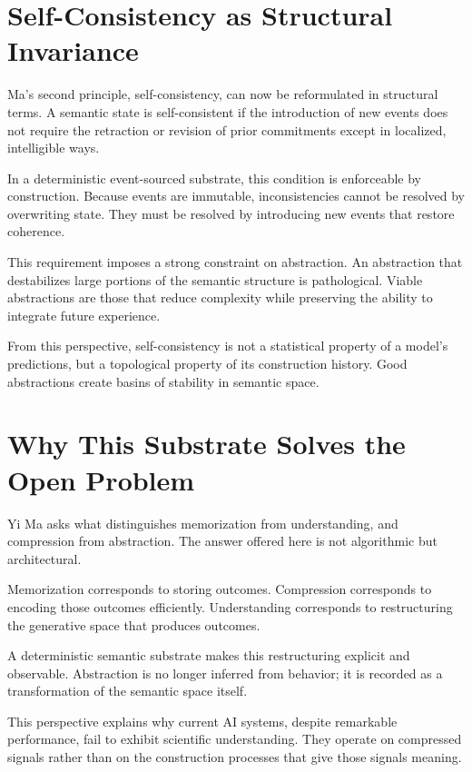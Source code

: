 \documentclass[11pt]{article}
\begin{document}
\section{Self-Consistency as Structural Invariance}

Ma’s second principle, self-consistency, can now be reformulated in
structural terms. A semantic state is self-consistent if the introduction
of new events does not require the retraction or revision of prior
commitments except in localized, intelligible ways.

In a deterministic event-sourced substrate, this condition is enforceable
by construction. Because events are immutable, inconsistencies cannot be
resolved by overwriting state. They must be resolved by introducing new
events that restore coherence.

This requirement imposes a strong constraint on abstraction. An
abstraction that destabilizes large portions of the semantic structure is
pathological. Viable abstractions are those that reduce complexity while
preserving the ability to integrate future experience.

From this perspective, self-consistency is not a statistical property of a
model’s predictions, but a topological property of its construction
history. Good abstractions create basins of stability in semantic space.

\section{Why This Substrate Solves the Open Problem}

Yi Ma asks what distinguishes memorization from understanding, and
compression from abstraction. The answer offered here is not algorithmic
but architectural.

Memorization corresponds to storing outcomes. Compression corresponds to
encoding those outcomes efficiently. Understanding corresponds to
restructuring the generative space that produces outcomes.

A deterministic semantic substrate makes this restructuring explicit and
observable. Abstraction is no longer inferred from behavior; it is
recorded as a transformation of the semantic space itself.

This perspective explains why current AI systems, despite remarkable
performance, fail to exhibit scientific understanding. They operate on
compressed signals rather than on the construction processes that give
those signals meaning.
\end{document}
